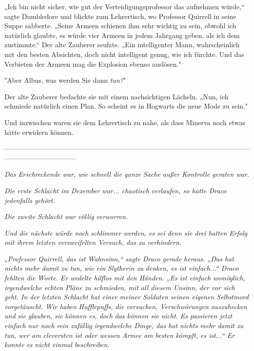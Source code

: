 {„Ich bin nicht sicher, wie gut der Verteidigungsprofessor das aufnehmen würde,“ sagte Dumbledore und blickte zum Lehrertisch, wo Professor Quirrell in seine Suppe sabberte. „Seine Armeen schienen ihm sehr wichtig zu sein, obwohl ich natürlich glaubte, es würde vier Armeen in jedem Jahrgang geben, als ich dem zustimmte.“ Der alte Zauberer seufzte. „Ein intelligenter Mann, wahrscheinlich mit den besten Absichten, doch nicht intelligent genug, wie ich fürchte. Und das Verbieten der Armeen mag die Explosion ebenso auslösen."

"Aber Albus, was werden Sie dann \emph{tun?}"

Der alte Zauberer bedachte sie mit einem nachsichtigen Lächeln. „Nun, ich schmiede natürlich einen Plan. So scheint es in Hogwarts die neue Mode zu sein."

Und inzwischen waren sie dem Lehrertisch zu nahe, als dass Minerva noch etwas hätte erwidern können.

--------------------------------------------------------------------------------------------------------------------------------------------

\hfill\break \emph{Das} \emph{Erschreckende war, wie schnell die ganze Sache außer Kontrolle geraten war.}

\emph{Die erste Schlacht im Dezember war... chaotisch} \emph{verlaufen, so hatte Draco jedenfalls gehört.}

\emph{Die zweite Schlacht war völlig} \emph{\emph{ver}\emph{worren}\emph{.}}

\emph{Und die nächste würde noch} \emph{\emph{schlimmer}} \emph{werden, es sei denn sie drei hatten Erfolg mit ihrem letzten verzweifelten Versuch, das zu verhindern.}

\emph{„Professor Quirrell, das ist Wahnsinn,“ sagte Draco} \emph{gerade heraus. „Das hat nichts mehr} \emph{damit} \emph{zu tun, wie ein} \emph{Slytherin zu} \emph{denken, es ist einfach...“ Draco fehlten die Worte. Er wedelte hilflos mit den Händen. „Es ist einfach unmöglich, irgendwelche echten Pläne zu schmieden, mit all diesem Unsinn, der vor sich geht. In der letzten Schlacht hat einer meiner Soldaten seinen eigenen Selbstmord vorgetäuscht. Wir haben} \emph{\emph{Hufflepuffs,}} \emph{die versuchen, Verschwörungen auszuhecken und sie glauben, sie können es, doch} \emph{das können sie} \emph{\emph{nicht.}} \emph{Es passieren jetzt einfach} \emph{nur noch} \emph{rein zufällig irgendwelche} \emph{Dinge, das hat nichts mehr damit zu tun, wer am cleversten ist oder wessen Armee am besten kämpft, es ist...“ Er konnte es nicht einmal beschreiben.}

}
